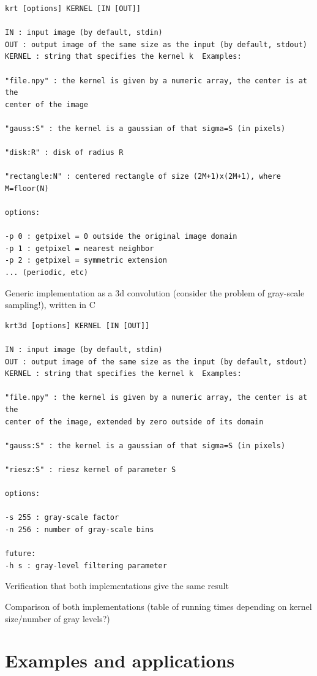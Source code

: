 \documentclass[12pt]{article}                  %
\begin{document}
{\small
\begin{verbatim}
krt [options] KERNEL [IN [OUT]]

IN : input image (by default, stdin)
OUT : output image of the same size as the input (by default, stdout)
KERNEL : string that specifies the kernel k  Examples:

"file.npy" : the kernel is given by a numeric array, the center is at the
center of the image

"gauss:S" : the kernel is a gaussian of that sigma=S (in pixels)

"disk:R" : disk of radius R

"rectangle:N" : centered rectangle of size (2M+1)x(2M+1), where M=floor(N)

options:

-p 0 : getpixel = 0 outside the original image domain
-p 1 : getpixel = nearest neighbor
-p 2 : getpixel = symmetric extension
... (periodic, etc)

\end{verbatim}
}

Generic implementation as a 3d convolution (consider the problem of
gray-scale sampling!), written in C

{\small
\begin{verbatim}
krt3d [options] KERNEL [IN [OUT]]

IN : input image (by default, stdin)
OUT : output image of the same size as the input (by default, stdout)
KERNEL : string that specifies the kernel k  Examples:

"file.npy" : the kernel is given by a numeric array, the center is at the
center of the image, extended by zero outside of its domain

"gauss:S" : the kernel is a gaussian of that sigma=S (in pixels)

"riesz:S" : riesz kernel of parameter S

options:

-s 255 : gray-scale factor
-n 256 : number of gray-scale bins

future:
-h s : gray-level filtering parameter

\end{verbatim}
}

Verification that both implementations give the same result

Comparison of both implementations (table of running times depending on
kernel size/number of gray levels?)

\section{Examples and applications}
\end{document}
